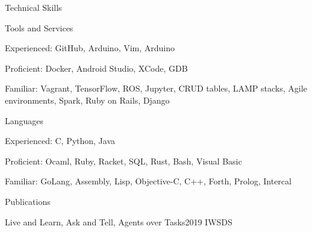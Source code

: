 \documentclass{resume} %
\begin{document}
\vspace{5cm}
\begin{rSection}{Technical Skills}

\begin{rSubsection}{Tools and Services}{}{}{}
\item Experienced: GitHub, Arduino, Vim, Arduino
\item Proficient: Docker, Android Studio, XCode, GDB
\item Familiar: Vagrant, TensorFlow, ROS, Jupyter, CRUD tables, LAMP stacks, Agile environments, Spark, Ruby on Rails, Django
\end{rSubsection}

\begin{rSubsection}{Languages}{}{}{}
\item Experienced: C, Python, Java
\item Proficient: Ocaml, Ruby, Racket, SQL, Rust, Bash, Visual Basic
\item Familiar: GoLang, Assembly, Lisp, Objective-C, C++, Forth, Prolog, Intercal
\end{rSubsection}

\end{rSection}
\begin{rSection}{Publications}
\begin{rSubsection}{Live and Learn, Ask and Tell, Agents over Tasks}{}{2019 IWSDS }{}
\end{rSubsection}
\end{rSection}
\end{document}
